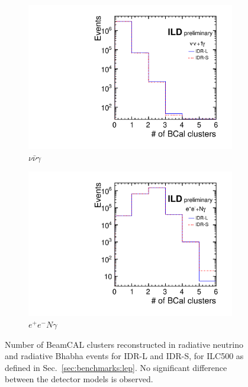 \begin{figure}[htbp]
\begin{subfigure}{0.49\hsize} 
\includegraphics[width=\textwidth]{Performance/fig/bcalveto_vv1g_comp.pdf}
 \caption{$\nu\bar{\nu}\gamma$ \label{fig:WIMP:BCal:IDR-L}}
 \end{subfigure}
\begin{subfigure}{0.49\hsize} 
\includegraphics[width=\textwidth]{Performance/fig/bcalveto_eeNg_comp.pdf}
\caption{$e^+e^- N\gamma$ \label{fig:WIMP:BCal:IDR-S}}
 \end{subfigure}
\caption{Number of BeamCAL clusters reconstructed in radiative neutrino and radiative Bhabha events for IDR-L and IDR-S, for ILC500 as defined in Sec.~\ref{sec:benchmarks:lep}. No significant difference between the detector models is observed.
}
\label{fig:WIMP:BCal}
\end{figure}

